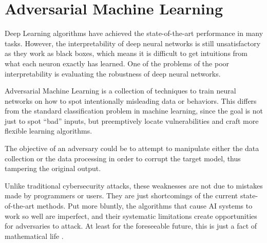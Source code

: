 \section{Adversarial Machine Learning}\label{sec:adversarial-machine-learning}
Deep Learning algorithms have achieved the state-of-the-art performance in many tasks. 
However, the interpretability of deep neural networks is still unsatisfactory as they work as black boxes, which means it is difficult to get intuitions from what each neuron exactly has learned. 
One of the problems of the poor interpretability is evaluating the robustness of deep neural networks. 


Adversarial Machine Learning is a collection of techniques to train neural networks on how to spot intentionally misleading data or behaviors. 
This differs from the standard classification problem in machine learning, since the goal is not just to spot “bad” inputs, but preemptively locate vulnerabilities and craft more flexible learning algorithms.

The objective of an adversary
could be to attempt to manipulate either the data collection or
the data processing in order to corrupt the target model, thus
tampering the original output. 

Unlike traditional cybersecurity
attacks, these weaknesses are not due to mistakes made by programmers or users. They are
just shortcomings of the current state-of-the-art
methods. Put more bluntly, the algorithms that
cause AI systems to work so well are imperfect,
and their systematic limitations create opportunities for adversaries to attack. At least for the foreseeable future, this is just
a fact of mathematical life \cite{Comiter2019AttackingAI}.

